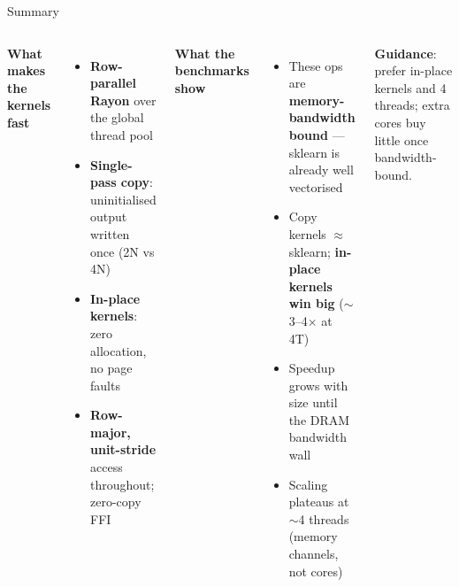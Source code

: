 \documentclass[aspectratio=169]{beamer}
\begin{document}
\begin{frame}{Summary}
  \begin{columns}[T]
    \textbf{What makes the kernels fast}
    \begin{itemize}
      \item \textbf{Row-parallel Rayon} over the global thread pool
      \item \textbf{Single-pass copy}: uninitialised output written once (2N vs 4N)
      \item \textbf{In-place kernels}: zero allocation, no page faults
      \item \textbf{Row-major, unit-stride} access throughout; zero-copy FFI
    \end{itemize}
    \textbf{What the benchmarks show}
    \begin{itemize}
      \item These ops are \textbf{memory-bandwidth bound} --- sklearn is already
            well vectorised
      \item Copy kernels $\approx$ sklearn; \textbf{in-place kernels win big}
            ($\sim$3--4$\times$ at 4T)
      \item Speedup grows with size until the DRAM bandwidth wall
      \item Scaling plateaus at $\sim$4 threads (memory channels, not cores)
    \end{itemize}
    \vspace{0.4em}
    \textbf{Guidance}: prefer in-place kernels and 4 threads; extra cores buy
    little once bandwidth-bound.
  \end{columns}
\end{frame}
\end{document}
